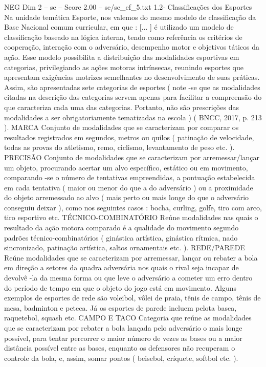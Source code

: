 \begin{textsample}{NEG Dim 2 – se – Score 2.00 – se/se\_ef\_5.txt}  \label{ex:f2_neg_270}
1.2- Classificações dos Esportes Na unidade temática Esporte, nos valemos do mesmo modelo de classificação da Base Nacional comum curricular, em que : [... ] é utilizado um modelo de classificação baseado na lógica interna, tendo como referência os critérios de cooperação, interação com o adversário, desempenho motor e objetivos táticos da ação.
Esse modelo possibilita a distribuição das modalidades esportivas em categorias, privilegiando as ações motoras intrínsecas, reunindo esportes que apresentam exigências motrizes semelhantes no desenvolvimento de suas práticas.
Assim, são apresentadas sete categorias de esportes ( note -se que as modalidades citadas na descrição das categorias servem apenas para facilitar a compreensão do que caracteriza cada uma das categorias.
Portanto, não são prescrições das modalidades a ser obrigatoriamente tematizadas na escola ) ( BNCC, 2017, p. 213 ).
MARCA Conjunto de modalidades que se caracterizam por comparar os resultados registrados em segundos, metros ou quilos ( patinação de velocidade, todas as provas do atletismo, remo, ciclismo, levantamento de peso etc. ).
PRECISÃO Conjunto de modalidades que se caracterizam por arremessar/lançar um objeto, procurando acertar um alvo específico, estático ou em movimento, comparando -se o número de tentativas empreendidas, a pontuação estabelecida em cada tentativa ( maior ou menor do que a do adversário ) ou a proximidade do objeto arremessado ao alvo ( mais perto ou mais longe do que o adversário conseguiu deixar ), como nos seguintes casos : bocha, curling, golfe, tiro com arco, tiro esportivo etc.
TÉCNICO-COMBINATÓRIO Reúne modalidades nas quais o resultado da ação motora comparado é a qualidade do movimento segundo padrões técnico-combinatórios ( ginástica artística, ginástica rítmica, nado sincronizado, patinação artística, saltos ornamentais etc. ).
REDE/PAREDE Reúne modalidades que se caracterizam por arremessar, lançar ou rebater a bola em direção a setores da quadra adversária nos quais o rival seja incapaz de devolvê -la da mesma forma ou que leve o adversário a cometer um erro dentro do período de tempo em que o objeto do jogo está em movimento.
Alguns exemplos de esportes de rede são voleibol, vôlei de praia, tênis de campo, tênis de mesa, badminton e peteca.
Já os esportes de parede incluem pelota basca, raquetebol, squash etc.
CAMPO E TACO Categoria que reúne as modalidades que se caracterizam por rebater a bola lançada pelo adversário o mais longe possível, para tentar percorrer o maior número de vezes as bases ou a maior distância possível entre as bases, enquanto os defensores não recuperam o controle da bola, e, assim, somar pontos ( beisebol, críquete, softbol etc. ).

\end{textsample}
